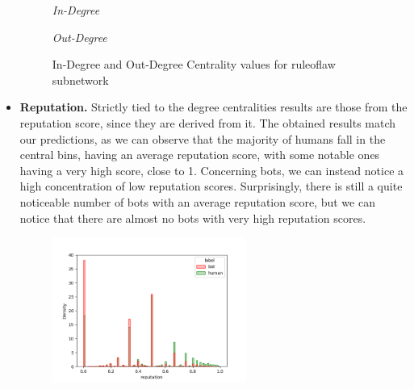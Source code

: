 \documentclass[12pt, a4paper]{article}
\begin{document}
\begin{itemize}
\begin{figure}[H]
\begin{minipage}[b]{0.49\textwidth}
        				\textit{\small In-Degree}
    				\end{minipage}
    				\hfill
    				\begin{minipage}[b]{0.49\textwidth}
        				\centering
        				\setlength{\fboxsep}{0pt}
    					\setlength{\fboxrule}{0.5pt}
        				\textit{\small Out-Degree}
    				\end{minipage}
    				\caption{In-Degree and Out-Degree Centrality values for ruleoflaw subnetwork}
				\end{figure}
			\item \textbf{Reputation.} Strictly tied to the degree centralities results are those from the reputation score, since they are derived from it.
                The obtained results match our predictions, as we can observe that the majority of humans fall in the central bins, having an average reputation score, with some notable ones having a very high score, close to 1. Concerning bots, we can instead notice a high concentration of low reputation scores. Surprisingly, there is still a quite noticeable number of bots with an average reputation score, but we can notice that there are almost no bots with very high reputation scores.
                \begin{figure}[H]
                	\centering
                    \includegraphics[width=0.6\textwidth]{results/complete_reputation.png}

\end{figure}
\end{itemize}
\end{document}
